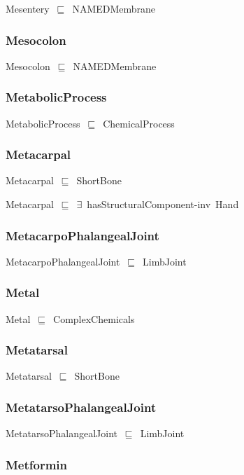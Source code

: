 \documentclass{article}
\begin{document}
Mesentery~\ensuremath{\sqsubseteq}~NAMEDMembrane~

\subsubsection*{Mesocolon}

Mesocolon~\ensuremath{\sqsubseteq}~NAMEDMembrane~

\subsubsection*{MetabolicProcess}

MetabolicProcess~\ensuremath{\sqsubseteq}~ChemicalProcess~

\subsubsection*{Metacarpal}

Metacarpal~\ensuremath{\sqsubseteq}~ShortBone~

Metacarpal~\ensuremath{\sqsubseteq}~\ensuremath{\exists}~hasStructuralComponent-inv~Hand~

\subsubsection*{MetacarpoPhalangealJoint}

MetacarpoPhalangealJoint~\ensuremath{\sqsubseteq}~LimbJoint~

\subsubsection*{Metal}

Metal~\ensuremath{\sqsubseteq}~ComplexChemicals~

\subsubsection*{Metatarsal}

Metatarsal~\ensuremath{\sqsubseteq}~ShortBone~

\subsubsection*{MetatarsoPhalangealJoint}

MetatarsoPhalangealJoint~\ensuremath{\sqsubseteq}~LimbJoint~

\subsubsection*{Metformin}
\end{document}
